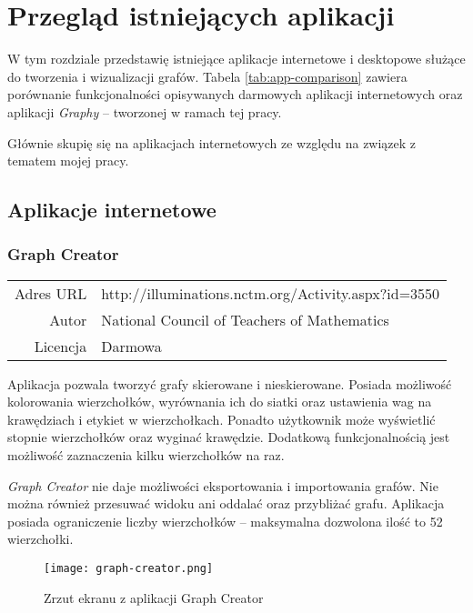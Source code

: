 \chapter{Przegląd istniejących aplikacji}

W tym rozdziale przedstawię istniejące aplikacje internetowe \cite{mathex} i desktopowe służące do tworzenia i wizualizacji grafów. Tabela \ref{tab:app-comparison} zawiera porównanie funkcjonalności opisywanych darmowych aplikacji internetowych oraz aplikacji \emph{Graphy} -- tworzonej w ramach tej pracy. 

Głównie skupię się na aplikacjach internetowych ze względu na związek z tematem mojej pracy. 

\section{Aplikacje internetowe}

\subsection*{Graph Creator}
\bigskip
\noindent\begin{tabularx}{\textwidth}{r|X|}
\cline{2-2}
  Adres URL & http://illuminations.nctm.org/Activity.aspx?id=3550 \\ 
\cline{2-2}
 Autor & National Council of Teachers of Mathematics \\ 
\cline{2-2}
 Licencja & Darmowa\\  
\cline{2-2}
\end{tabularx} 
\bigskip

Aplikacja pozwala tworzyć grafy skierowane i nieskierowane. Posiada możliwość kolorowania wierzchołków, wyrównania ich do siatki oraz ustawienia wag na krawędziach i etykiet w wierzchołkach. Ponadto użytkownik może wyświetlić stopnie wierzchołków oraz wyginać krawędzie. Dodatkową funkcjonalnością jest możliwość zaznaczenia kilku wierzchołków na raz. 

\textit{Graph Creator} nie daje możliwości eksportowania i importowania grafów. Nie można również przesuwać widoku ani oddalać oraz przybliżać grafu. Aplikacja posiada ograniczenie liczby wierzchołków -- maksymalna dozwolona ilość to 52 wierzchołki.

\begin{figure}[H]
\centering
\texttt{[image: graph-creator.png]}
\caption{Zrzut ekranu z aplikacji Graph Creator}
\end{figure}

